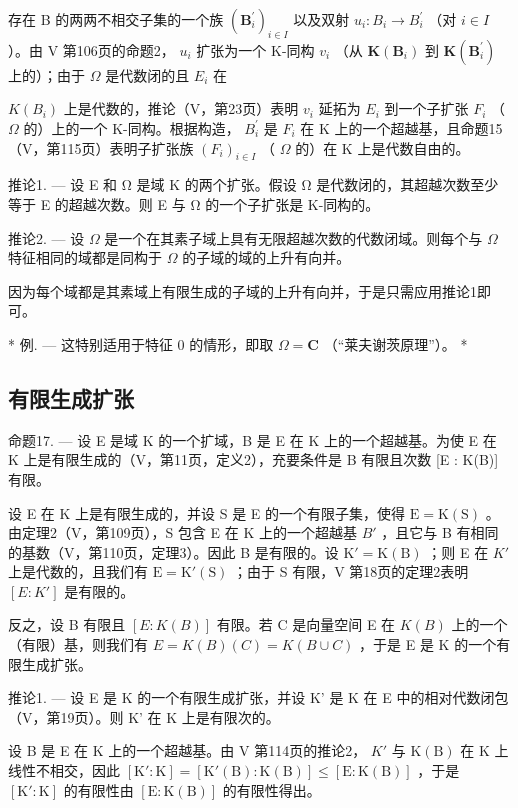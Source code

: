 存在 B 的两两不相交子集的一个族 \((\mathbf{B}_{i}^{\prime})_{i\in I}\) 以及双射 \(u_{i}:B_{i}\to B_{i}^{\prime}\) （对 \(i\in I\) ）。由 V 第106页的命题2， \(u_{i}\) 扩张为一个 K-同构 \(v_{i}\) （从 \(\mathbf{K}(\mathbf{B}_{i})\) 到 \(\mathbf{K}(\mathbf{B}_{i}^{\prime})\) 上的）；由于 \(\Omega\) 是代数闭的且 \(E_{i}\) 在

\(K(B_{i})\) 上是代数的，推论（V，第23页）表明 \(v_{i}\) 延拓为 \(E_{i}\) 到一个子扩张 \(F_{i}\) （ \(\Omega\) 的）上的一个 K-同构。根据构造， \(B_{i}^{\prime}\) 是 \(F_{i}\) 在 K 上的一个超越基，且命题15（V，第115页）表明子扩张族 \((F_{i})_{i\in I}\) （ \(\Omega\) 的）在 K 上是代数自由的。

推论1. --- 设 E 和 Ω 是域 K 的两个扩张。假设 Ω 是代数闭的，其超越次数至少等于 E 的超越次数。则 E 与 Ω 的一个子扩张是 K-同构的。

推论2. --- 设 \(\Omega\) 是一个在其素子域上具有无限超越次数的代数闭域。则每个与 \(\Omega\) 特征相同的域都是同构于 \(\Omega\) 的子域的域的上升有向并。

因为每个域都是其素域上有限生成的子域的上升有向并，于是只需应用推论1即可。

* 例. --- 这特别适用于特征 0 的情形，即取 \(\Omega = \mathbf{C}\) （“莱夫谢茨原理”）。 *

\subsection{有限生成扩张}

命题17. --- 设 E 是域 K 的一个扩域，B 是 E 在 K 上的一个超越基。为使 E 在 K 上是有限生成的（V，第11页，定义2），充要条件是 B 有限且次数 {[}E : K(B){]} 有限。

设 E 在 K 上是有限生成的，并设 S 是 E 的一个有限子集，使得 \(\mathrm{E} = \mathrm{K}(\mathrm{S})\) 。由定理2（V，第109页），S 包含 E 在 K 上的一个超越基 \(B'\) ，且它与 B 有相同的基数（V，第110页，定理3）。因此 B 是有限的。设 \(\mathrm{K}' = \mathrm{K}(\mathrm{B})\) ；则 E 在 \(K'\) 上是代数的，且我们有 \(\mathrm{E} = \mathrm{K}'(\mathrm{S})\) ；由于 S 有限，V 第18页的定理2表明 \([E : K']\) 是有限的。

反之，设 B 有限且 \([E:K(B)]\) 有限。若 C 是向量空间 E 在 \(K(B)\) 上的一个（有限）基，则我们有 \(E = K(B)(C) = K(B \cup C)\) ，于是 E 是 K 的一个有限生成扩张。

推论1. --- 设 E 是 K 的一个有限生成扩张，并设 K' 是 K 在 E 中的相对代数闭包（V，第19页）。则 K' 在 K 上是有限次的。

设 B 是 E 在 K 上的一个超越基。由 V 第114页的推论2， \(K'\) 与 \(\mathrm{K}(\mathrm{B})\) 在 K 上线性不相交，因此 \([\mathrm{K}' : \mathrm{K}] = [\mathrm{K}'(\mathrm{B}) : \mathrm{K}(\mathrm{B})] \leq [\mathrm{E} : \mathrm{K}(\mathrm{B})]\) ，于是 \([\mathrm{K}' : \mathrm{K}]\) 的有限性由 \([\mathrm{E} : \mathrm{K}(\mathrm{B})]\) 的有限性得出。

